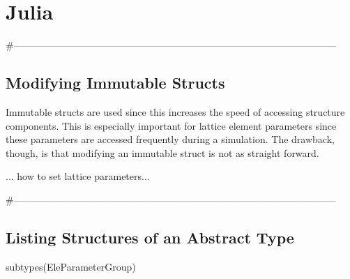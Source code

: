 \chapter{Julia}
\label{c:julia}

#---------------------------------------------------------------------------------------------------
\section{Modifying Immutable Structs}
\label{s:immut.struct}

Immutable structs are used since this increases the speed of accessing structure components. This is especially important for lattice element parameters since these parameters are accessed frequently during a simulation. The drawback, though, is that modifying an immutable struct is not as straight forward. 

... how to set lattice parameters...


#---------------------------------------------------------------------------------------------------
\section{Listing Structures of an Abstract Type}
\label{s:list.abs}


\begin{example}
  subtypes(EleParameterGroup)
\end{example}
